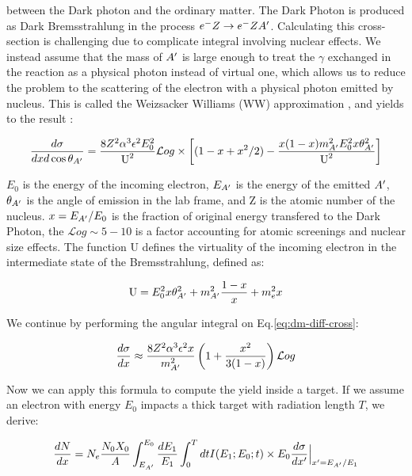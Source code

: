 between the Dark photon and the ordinary matter. The Dark Photon is produced as Dark Bremsstrahlung in the process $e^- Z \to e^- Z A'$. Calculating this cross-section is challenging due to complicate integral involving nuclear effects. We instead assume that the mass of $A'$ is large enough to treat the $\gamma$ exchanged in the reaction as a physical photon instead of virtual one, which allows us to reduce the problem to the scattering of the electron with a physical photon emitted by nucleus. This is called the Weizsacker Williams (WW) approximation \cite{Kim:1973he}, and yields to the result \cite{jdb}:

\begin{equation}
  \label{eq:dm-diff-cross}
  \frac{d\sigma}{dxd\cos{\theta_{A'}}} = \frac{8 Z^2 \alpha^3 \epsilon^2 E^2_0}{\textrm{U}^2} \mathcal{L}og \times \left[ (1 - x + x^2/2) - \frac{x(1-x)m^2_{A'}E^2_0 x \theta^2_{A'}}{\textrm{U}^2} \right]
\end{equation}

$E_0$ is the energy of the incoming electron, $E_{A'}$ is the energy of the emitted $A'$, $\theta_{A'}$ is the angle of emission in the lab frame, and Z is the atomic number of the nucleus. $x=E_{A'}/E_0$ is the fraction of original energy transfered to the Dark Photon, the $\mathcal{L}og \sim 5 - 10$ is a factor accounting for atomic screenings and nuclear size effects. The function U defines the virtuality of the incoming electron in the intermediate state of the Bremsstrahlung, defined as:

\begin{equation}
  \label{eq:u-func}
  \textrm{U} = E^2_0 x \theta^2_{A'} + m^2_{A'} \frac{1 - x}{x} + m^2_e x
\end{equation}

We continue by performing the angular integral on Eq.\ref{eq:dm-diff-cross}:

\begin{equation}
  \label{eq:dm-diff-cross-int}
  \frac{d\sigma}{dx} \approx \frac{8 Z^2 \alpha^3 \epsilon^2 x}{m^2_{A'}} \left( 1 + \frac{x^2}{3(1-x)} \right) \mathcal{L}og 
\end{equation}

Now we can apply this formula to compute the yield inside a target. If we assume an electron with energy $E_0$ impacts a thick target with radiation length $T$, we derive:

\begin{equation}
  \label{eq:dm-general-yield}
  \frac{dN}{dx} = N_e \frac{N_0 X_0}{A} \int_{E_{A'}}^{E_0} \frac{dE_1}{E_1} \int_0^T dt I(E_1;E_0;t) \times E_0 \frac{d\sigma}{dx'}\Big|_{x' = E_{A'}/E_1}
\end{equation}


